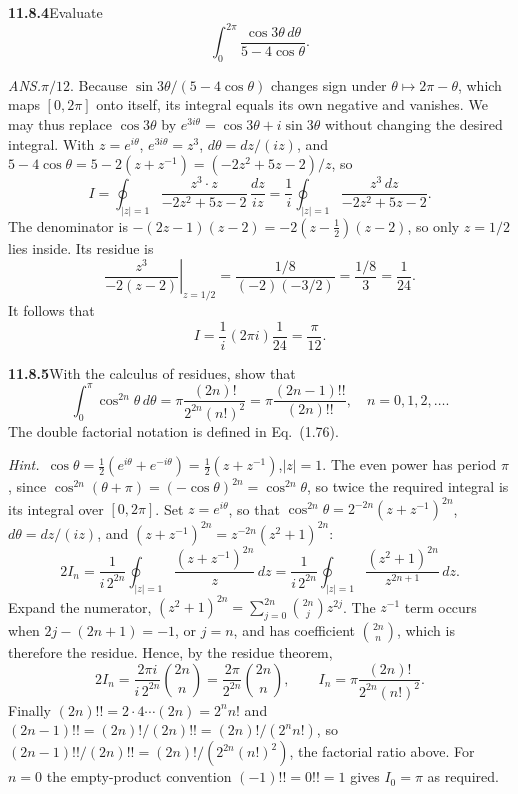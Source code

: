 \par\bigskip
\noindent\textbf{11.8.4}\quad Evaluate
\[
\int_{0}^{2\pi}\frac{\cos3\theta\,d\theta}{5-4\cos\theta}.
\]
\par\nobreak\hfill\emph{ANS.}\enspace $\pi/12$.
\solution
Because $\sin3\theta/(5-4\cos\theta)$ changes sign under
$\theta\mapsto2\pi-\theta$, which maps $[0,2\pi]$ onto itself, its
integral equals its own negative and vanishes. We may thus
replace $\cos3\theta$ by $e^{3i\theta}=\cos3\theta+i\sin3\theta$
without changing the desired integral. With $z=e^{i\theta}$,
$e^{3i\theta}=z^3$, $d\theta=dz/(iz)$, and
$5-4\cos\theta=5-2(z+z^{-1})=(-2z^2+5z-2)/z$, so
\[
I=\oint_{|z|=1}\frac{z^3\cdot z}{-2z^2+5z-2}\,\frac{dz}{iz}
=\frac1i\oint_{|z|=1}
\frac{z^3\,dz}{-2z^2+5z-2}.
\]
The denominator is $-(2z-1)(z-2)=-2(z-\tfrac12)(z-2)$, so only $z=1/2$
lies inside. Its residue is
\[
\left.\frac{z^3}{-2(z-2)}\right|_{z=1/2}
=\frac{1/8}{(-2)(-3/2)}=\frac{1/8}{3}=\frac1{24}.
\]
It follows that
\[
\boxed{I=\frac1i(2\pi i)\frac1{24}=\frac{\pi}{12}}.
\]

\par\bigskip
\noindent\textbf{11.8.5}\quad With the calculus of residues, show that
\[
\int_{0}^{\pi}\cos^{2n}\theta\,d\theta
=\pi\frac{(2n)!}{2^{2n}(n!)^{2}}
=\pi\frac{(2n-1)!!}{(2n)!!},\quad n=0,1,2,\ldots.
\]
The double factorial notation is defined in Eq.~(1.76).

\emph{Hint.}~$\cos\theta=\frac{1}{2}(e^{i\theta}+e^{-i\theta})
=\frac{1}{2}(z+z^{-1})$,\quad $|z|=1$.
\solution
The even power has period $\pi$, since
$\cos^{2n}(\theta+\pi)=(-\cos\theta)^{2n}=\cos^{2n}\theta$, so twice
the required integral is its integral over $[0,2\pi]$. Set
$z=e^{i\theta}$, so that $\cos^{2n}\theta=2^{-2n}(z+z^{-1})^{2n}$,
$d\theta=dz/(iz)$, and $(z+z^{-1})^{2n}=z^{-2n}(z^2+1)^{2n}$:
\[
2I_n=\frac1{i\,2^{2n}}\oint_{|z|=1}
\frac{(z+z^{-1})^{2n}}z\,dz
=\frac1{i\,2^{2n}}\oint_{|z|=1}
\frac{(z^2+1)^{2n}}{z^{2n+1}}\,dz.
\]
Expand the numerator,
$(z^2+1)^{2n}=\sum_{j=0}^{2n}\binom{2n}{j}z^{2j}$.
The $z^{-1}$ term occurs when $2j-(2n+1)=-1$, or $j=n$,
and has coefficient $\binom{2n}{n}$, which is therefore the residue.
Hence, by the residue theorem,
\[
2I_n=\frac{2\pi i}{i\,2^{2n}}\binom{2n}{n}
=\frac{2\pi}{2^{2n}}\binom{2n}{n},\qquad
\boxed{I_n=\pi\frac{(2n)!}{2^{2n}(n!)^2}}.
\]
Finally $(2n)!!=2\cdot4\cdots(2n)=2^n n!$ and
$(2n-1)!!=(2n)!/(2n)!!=(2n)!/(2^n n!)$, so
$(2n-1)!!/(2n)!!=(2n)!/(2^{2n}(n!)^2)$, the factorial ratio above. For $n=0$ the empty-product convention
$(-1)!!=0!!=1$ gives $I_0=\pi$ as required.

